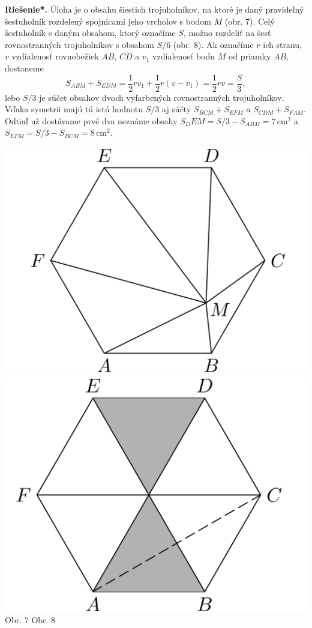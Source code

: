 \documentclass[11pt,a4paper,oneside,final]{book}
\newcommand{\rieh}{\textbf{Riešenie*.} }
\begin{document}
\rieh Úloha je o obsahu šiestich trojuholníkov, na ktoré je daný pravidelný šesťuholník rozdelený spojnicami jeho vrcholov s bodom $M$ (obr. 7). Celý šesťuholník s daným obsahom, ktorý označíme $S$, možno rozdeliť na šesť rovnostranných trojuholníkov s obsahom $S/6$ (obr. 8). Ak označíme $r$ ich stranu, $v$ vzdialenosť rovnobežiek $AB$, $CD$ a $v_1$ vzdialenosť bodu $M$ od priamky $AB$, dostaneme
$$S_{ABM} + S_{EDM} =\frac{1}{2}rv_1 +\frac{1}{2}r(v - v_1 ) = \frac{1}{2} rv =\frac{S}{3},$$
lebo $S/3$ je súčet obsahov dvoch vyfarbených rovnostranných trojuholníkov. Vďaka symetrii majú tú istú hodnotu $S/3$ aj súčty $S_{BCM} +S_{EFM}$ a $S_{CDM} +S_{FAM}$. Odtiaľ už dostávame prvé dva neznáme obsahy $S_DEM = S/3 - S_{ABM} = 7$\,cm$^2$ a $S_{EFM}= S/3 - S_{BCM} = 8$\,cm$^2$.
\begin{center}
\includegraphics[scale=0.3]{62D61} \includegraphics[scale=0.3]{62D62}\\

Obr. 7  \hspace{160pt} Obr. 8
\end{center}
\end{document}
